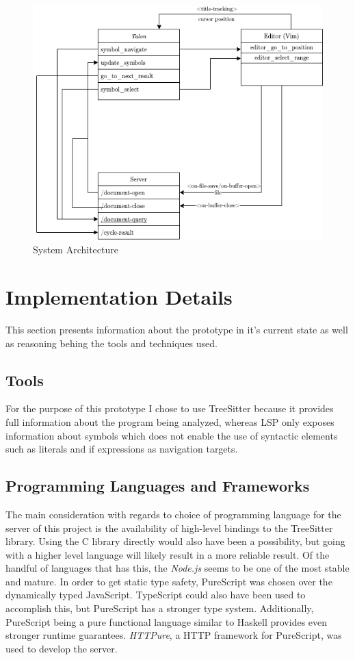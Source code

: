\documentclass[../thesis.tex]{subfiles}
\begin{document}
\begin{figure}[htpb]
    \centering
    \includegraphics[width=0.8\linewidth]{images/architecture.png}
    \caption{System Architecture}%
    \label{fig:architecture}
\end{figure}

\section{Implementation Details}%
\label{sec:implementation}
This section presents information about the prototype in it's current state as well as reasoning behing the tools and techniques used.
\subsection{Tools}%
\label{sub:tools}
For the purpose of this prototype I chose to use TreeSitter because it provides full information about the program
being analyzed, whereas LSP only exposes information about symbols which does not enable the use of
syntactic elements such as literals and if expressions as navigation targets.

\subsection{Programming Languages and Frameworks}
The main consideration with regards to choice of programming language for the server of this project is the availability of high-level bindings to the TreeSitter library.
Using the C library directly would also have been a possibility, but going with a higher level language will likely result in a more reliable result.
Of the handful of languages that has this, the \textit{Node.js} seems to be one of the most stable and mature.
In order to get static type safety, PureScript was chosen over the dynamically typed JavaScript.
TypeScript could also have been used to accomplish this, but PureScript has a stronger type system.
Additionally, PureScript being a pure functional language similar to Haskell provides even stronger runtime guarantees.
\textit{HTTPure}, a HTTP framework for PureScript, was used to develop the server.
\end{document}
